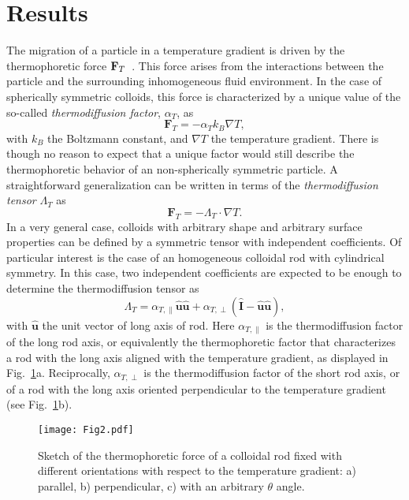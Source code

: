\documentclass[aps,pre,twocolumn,showpacs,superscriptaddress]{revtex4-1}
\begin{document}
\section{Results}
The migration of a particle in a temperature gradient is driven by the
thermophoretic force ${\bf F}_T$~\cite{piazza05,yang12forces,yang12drift}. 
This force arises from the interactions between the particle and the
surrounding inhomogeneous fluid environment. In the case of
spherically symmetric colloids, this force is characterized by a
unique value of the so-called {\em thermodiffusion factor},
$\alpha_T$, as
\begin{equation}
\textbf{F}_T=-\alpha_Tk_B\nabla T,
\label{eq4}
\end{equation}
with $k_B$ the Boltzmann constant, and $\nabla T$ the temperature
gradient.  There is though no reason to expect that a unique factor
would still describe the thermophoretic behavior of an non-spherically
symmetric particle. %
A straightforward generalization can be written in terms of the {\em
  thermodiffusion tensor} $\Lambda_T$ as
\begin{equation}
  \textbf{F}_T=-\Lambda_T \cdot \nabla T.
  \label{eq8}
\end{equation}
In a very general case, colloids with arbitrary shape and arbitrary
surface properties can be defined by a symmetric tensor with
independent coefficients. Of particular interest is the case of an
homogeneous colloidal rod with cylindrical symmetry. In this case, two
independent coefficients are expected to be enough to determine the
thermodiffusion tensor as
\begin{equation}
  \Lambda_T=\alpha_{T,\|}\hat{\textbf{u}}\hat{\textbf{u}}+
\alpha_{T,\perp}(\hat{\textbf{I}}-\hat{\textbf{u}}\hat{\textbf{u}}),
  \label{eq7}
\end{equation}
with $\hat{\textbf{u}}$ the unit vector of long axis of rod. Here
$\alpha_{T,\|}$ is the thermodiffusion factor of the long rod axis, or
equivalently the thermophoretic factor that characterizes a rod with
the long axis aligned with the temperature gradient, as displayed in
Fig.~\ref{fig:t-anisotrop}a. Reciprocally, $\alpha_{T,\perp}$ is the
thermodiffusion factor of the short rod axis, or of a rod with the
long axis oriented perpendicular to the temperature gradient (see
Fig.~\ref{fig:t-anisotrop}b). %
\begin{figure}[h!]
\texttt{[image: Fig2.pdf]}
\caption{Sketch of the thermophoretic force of a colloidal rod fixed
  with different orientations with respect to the temperature
  gradient: a) parallel, b) perpendicular, c) with an arbitrary
  $\theta$ angle. \label{fig:t-anisotrop}}
\end{figure}
\end{document}
